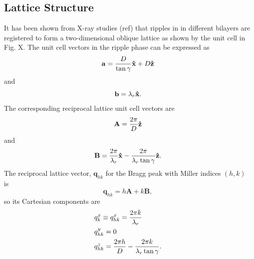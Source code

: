 \subsection{Lattice Structure}
It has been shown from X-ray studies (ref) that ripples in in different bilayers
are registered to form a two-dimensional oblique lattice as shown by the unit 
cell in Fig. X. 
The unit cell vectors in the ripple phase can be expressed as 
\begin{equation}
  \mathbf{a} = \frac{D}{\tan\gamma}\mathbf{\hat{x}} + D\mathbf{\hat{z}}
\end{equation}
and
\begin{equation}
  \mathbf{b} = \lambda_r\mathbf{\hat{x}}.
\end{equation}
The corresponding reciprocal lattice unit cell vectors are
\begin{equation}
  \mathbf{A} = \frac{2\pi}{D}\mathbf{\hat{z}}
\end{equation}
and
\begin{equation}
  \mathbf{B} = \frac{2\pi}{\lambda_r}\mathbf{\hat{x}} - \frac{2\pi}{\lambda_r\tan\gamma}\mathbf{\hat{z}}.
\end{equation}
The reciprocal lattice vector, $\mathbf{q}_{hk}$ for the Bragg peak with 
Miller indices $(h,k)$ is 
\begin{equation}
  \mathbf{q}_{hk}=h\mathbf{A}+k\mathbf{B},
\end{equation}
so its Cartesian components are
\begin{align}
  & q_{k}^x \equiv q_{hk}^x = \frac{2\pi k}{\lambda_r} \\
  & q_{hk}^y = 0 \\
  & q_{hk}^z = \frac{2\pi h}{D} - \frac{2\pi k}{\lambda_r\tan\gamma}.
\end{align}



